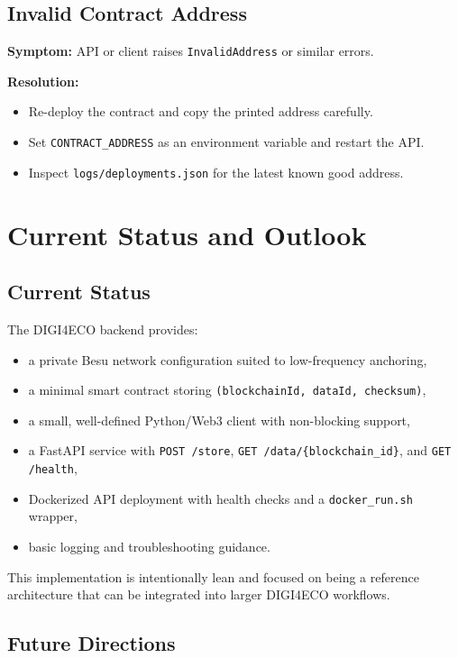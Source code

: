 \documentclass[11pt,a4paper]{article}
\begin{document}
\subsection{Invalid Contract Address}

\textbf{Symptom:} API or client raises \texttt{InvalidAddress} or similar errors.

\textbf{Resolution:}

\begin{itemize}[noitemsep]
  \item Re-deploy the contract and copy the printed address carefully.
  \item Set \texttt{CONTRACT\_ADDRESS} as an environment variable and restart the API.
  \item Inspect \texttt{logs/deployments.json} for the latest known good address.
\end{itemize}

\section{Current Status and Outlook}

\subsection{Current Status}

The DIGI4ECO backend provides:

\begin{itemize}[noitemsep]
  \item a private Besu network configuration suited to low-frequency anchoring,
  \item a minimal smart contract storing \texttt{(blockchainId, dataId, checksum)},
  \item a small, well-defined Python/Web3 client with non-blocking support,
  \item a FastAPI service with \texttt{POST /store}, \texttt{GET /data/\{blockchain\_id\}}, and \texttt{GET /health},
  \item Dockerized API deployment with health checks and a \texttt{docker\_run.sh} wrapper,
  \item basic logging and troubleshooting guidance.
\end{itemize}

This implementation is intentionally lean and focused on being a reference architecture that can be integrated into larger DIGI4ECO workflows.

\subsection{Future Directions}
\end{document}
